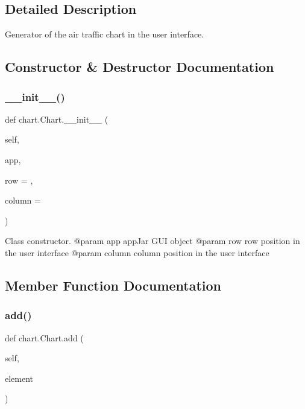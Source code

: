 \subsection{Detailed Description}
\begin{DoxyVerb}Generator of the air traffic chart in the user interface.\end{DoxyVerb}
 

\subsection{Constructor \& Destructor Documentation}
\mbox{\label{classchart_1_1_chart_ac34f8a32979d39fca87fe1f69fd266d0}} 
\subsubsection{\texorpdfstring{\+\_\+\+\_\+init\+\_\+\+\_\+()}{\_\_init\_\_()}}
{\footnotesize\ttfamily def chart.\+Chart.\+\_\+\+\_\+init\+\_\+\+\_\+ (\begin{DoxyParamCaption}\item[{}]{self,  }\item[{}]{app,  }\item[{}]{row = {},  }\item[{}]{column = {} }\end{DoxyParamCaption})}

\begin{DoxyVerb}Class constructor.
    @param app       appJar GUI object
    @param row       row position in the user interface
    @param column    column position in the user interface
\end{DoxyVerb}
 

\subsection{Member Function Documentation}
\mbox{\label{classchart_1_1_chart_a0eaaeae9230e9bbbd4bf3a8b8d9626e0}} 
\subsubsection{\texorpdfstring{add()}{add()}}
{\footnotesize\ttfamily def chart.\+Chart.\+add (\begin{DoxyParamCaption}\item[{}]{self,  }\item[{}]{element }\end{DoxyParamCaption})}

